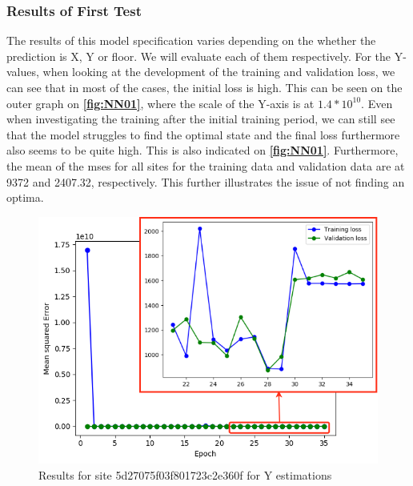 \subsubsection{Results of First Test}
The results of this model specification varies depending on the whether the prediction is X, Y or floor. We will evaluate each of them respectively. For the Y-values, when looking at the development of the training and validation loss, we can see that in most of the cases, the initial loss is high. This can be seen on the outer graph on \textbf{\autoref{fig:NN01}}, where the scale of the Y-axis is at $1.4*10^{10}$. Even when investigating the training after the initial training period, we can still see that the model struggles to find the optimal state and the final loss furthermore also seems to be quite high. This is also indicated on \textbf{\autoref{fig:NN01}}. Furthermore, the mean of the \gls{mse}s for all sites for the training data and validation data are at 9372 and 2407.32, respectively. This further illustrates the issue of not finding an optima. 

\begin{figure}[H]
    \centering
    \includegraphics[scale=0.5]{Images/Experiments/NN/1.initial/initial_y_5d27075f03f801723c2e360f.png}
    \caption{Results for site 5d27075f03f801723c2e360f for Y estimations}
    \label{fig:NN01}
\end{figure}



